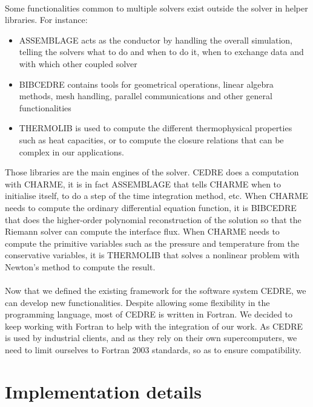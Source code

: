     \paragraph{}
    Some functionalities common to multiple solvers exist outside the solver in helper libraries.
    For instance:
    \begin{itemize}
      \item ASSEMBLAGE acts as the conductor by handling the overall simulation, telling the solvers what to do and when to do it, when to exchange data and with which other coupled solver
      \item BIBCEDRE contains tools for geometrical operations, linear algebra methods, mesh handling, parallel communications and other general functionalities
      \item THERMOLIB is used to compute the different thermophysical properties such as heat capacities, or to compute the closure relations that can be complex in our applications.
    \end{itemize}
    Those libraries are the main engines of the solver.
    CEDRE does a computation with CHARME, it is in fact ASSEMBLAGE that tells CHARME when to initialise itself, to do a step of the time integration method, etc.
    When CHARME needs to compute the ordinary differential equation function, it is BIBCEDRE that does the higher-order polynomial reconstruction of the solution so that the Riemann solver can compute the interface flux.
    When CHARME needs to compute the primitive variables such as the pressure and temperature from the conservative variables, it is THERMOLIB that solves a nonlinear problem with Newton's method to compute the result.

    \paragraph{}
    Now that we defined the existing framework for the software system CEDRE, we can develop new functionalities.
    Despite allowing some flexibility in the programming language, most of CEDRE is written in Fortran.
    We decided to keep working with Fortran to help with the integration of our work.
    As CEDRE is used by industrial clients, and as they rely on their own supercomputers, we need to limit ourselves to Fortran 2003 standards, so as to ensure compatibility.


  \section{Implementation details}


